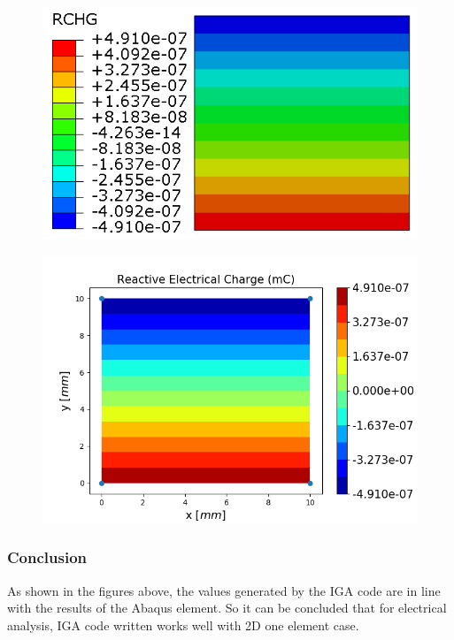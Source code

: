 \documentclass[11pt]{article}
\begin{document}
\begin{figure}[H]
	\centering
	\begin{minipage}{.5\textwidth}
		\centering
		\includegraphics[width=1\linewidth]{E1RCHG.png}
		\label{E1RCHG}
	\end{minipage}%
	\begin{minipage}{.6\textwidth}
		\centering
		\includegraphics[width=1\linewidth]{E1RCHG_IGA.png}
		\label{E1RCHG_IGA}
	\end{minipage}
\end{figure}

\subsubsection{Conclusion}
As shown in the figures above, the values generated by the IGA code are in line with the results of the Abaqus element. So it can be concluded that for electrical analysis, IGA code written works well with 2D one element case.
\end{document}
